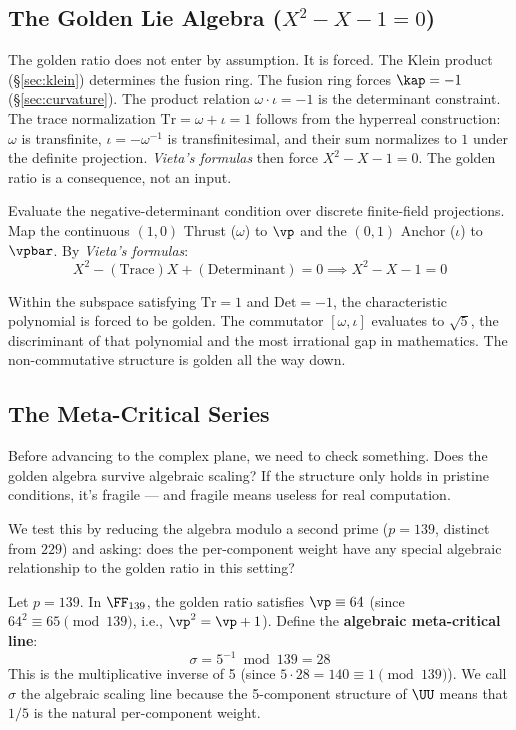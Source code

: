 \subsection{The Golden Lie Algebra ($X^2 - X - 1 = 0$)}\label{sec:golden}

The golden ratio does not enter by assumption. It is forced. The Klein product (\S\ref{sec:klein}) determines the fusion ring. The fusion ring forces $\kap = -1$ (\S\ref{sec:curvature}). The product relation $\omega \cdot \iota = -1$ is the determinant constraint. The trace normalization $\mathrm{Tr} = \omega + \iota = 1$ follows from the hyperreal construction: $\omega$ is transfinite, $\iota = -\omega^{-1}$ is transfinitesimal, and their sum normalizes to $1$ under the definite projection. \emph{Vieta's formulas} then force $X^2 - X - 1 = 0$. The golden ratio is a consequence, not an input.

Evaluate the negative-determinant condition over discrete finite-field projections. Map the continuous $(1,0)$ Thrust ($\omega$) to $\vp$ and the $(0,1)$ Anchor ($\iota$) to $\vpbar$. By \emph{Vieta's formulas}:
$$X^2 - (\text{Trace})X + (\text{Determinant}) = 0 \implies X^2 - X - 1 = 0$$

Within the subspace satisfying $\mathrm{Tr} = 1$ and $\mathrm{Det} = -1$, the characteristic polynomial is forced to be golden. The commutator $[\omega, \iota]$ evaluates to $\sqrt{5}$, the discriminant of that polynomial and the most irrational gap in mathematics. The non-commutative structure is golden all the way down.

\subsection{The Meta-Critical Series}

Before advancing to the complex plane, we need to check something. Does the golden algebra survive algebraic scaling? If the structure only holds in pristine conditions, it's fragile --- and fragile means useless for real computation.

We test this by reducing the algebra modulo a second prime ($p = 139$, distinct from $229$) and asking: does the per-component weight have any special algebraic relationship to the golden ratio in this setting?

\begin{definition}\label{def:sigma}
Let $p = 139$. In $\FF_{139}$, the golden ratio satisfies $\vp \equiv 64$ (since $64^2 \equiv 65 \pmod{139}$, i.e., $\vp^2 = \vp + 1$). Define the \textbf{algebraic meta-critical line}:
$$\sigma = 5^{-1} \bmod{139} = 28$$
This is the multiplicative inverse of 5 (since $5 \cdot 28 = 140 \equiv 1 \pmod{139}$). We call $\sigma$ the algebraic scaling line because the 5-component structure of $\UU$ means that $1/5$ is the natural per-component weight.
\end{definition}

